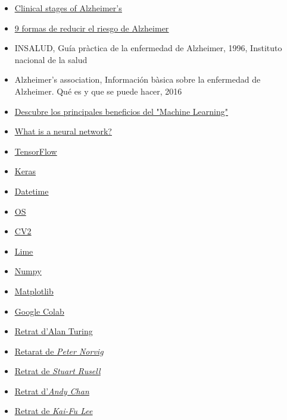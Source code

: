 \documentclass[a4paper,12pt]{article}
\begin{document}
\begin{itemize}
    \item \href{https://www.alzinfo.org/understand-alzheimers/clinical-stages-of-alzheimers/}{\underline{Clinical stages of Alzheimer's}}
    \item \href{https://www.ceafa.es/es/que-comunicamos/noticias/9-formas-de-reducir-el-riesgo-de-alzheimer}{\underline{9 formas de reducir el riesgo de Alzheimer}}
    \item INSALUD, Guía pràctica de la enfermedad de Alzheimer, 1996, Instituto nacional de la salud
    \item Alzheimer’s association, Información bàsica sobre la enfermedad de Alzheimer. Qué es y que se puede hacer, 2016
    \item \href{https://www.iberdrola.com/innovacion/machine-learning-aprendizaje-automatico}{\underline{Descubre los principales beneficios del "Machine Learning"}}
    \item \href{https://aws.amazon.com/es/what-is/neural-network/}{\underline{What is a neural network?}}
    \item \href{https://www.tensorflow.org/?hl=es-419}{\underline{TensorFlow}}
    \item \href{https://keras.io/}{\underline{Keras}}
    \item \href{https://www.w3schools.com/python/python_datetime.asp}{\underline{Datetime}}
    \item \href{https://docs.python.org/3/library/os.html}{\underline{OS}}
    \item \href{https://pypi.org/project/opencv-python/}{\underline{CV2}}
    \item \href{https://towardsdatascience.com/lime-how-to-interpret-machine-learning-models-with-python-94b0e7e4432e}{\underline{Lime}}
    \item \href{https://numpy.org/}{\underline{Numpy}}
    \item \href{https://matplotlib.org/}{\underline{Matplotlib}}
    \item \href{https://colab.research.google.com/}{\underline{Google Colab}}
    \item \href{https://upload.wikimedia.org/wikipedia/commons/a/a1/Alan_Turing_Aged_16.jpg}{\underline{Retrat d'Alan Turing}}
    \item \href{https://cs.berkeley.edu/sites/default/files/news_image/peter_norvig_speaking_at_university_of_california_berkeley_2013.jpg}{\underline{Retarat de \textit{Peter Norvig}}}
    \item \href{https://cs.berkeley.edu/sites/default/files/eecs_tout/russell-aqua.jpg}{\underline{Retrat de \textit{Stuart Rusell}}}
    \item \href{https://media.licdn.com/dms/image/C5603AQHgogiTxs2TZg/profile-displayphoto-shrink_800_800/0/1565701087600?e=2147483647&v=beta&t=p5ZjgearbT6mUGtGi2AEwDY07gaEWxmlGYDypO0HUVU}{\underline{Retrat d'\textit{Andy Chan}}}
    \item \href{https://upload.wikimedia.org/wikipedia/commons/0/0d/Capture_medium.jpg}{\underline{Retrat de \textit{Kai-Fu Lee}}}
\end{itemize}
\end{document}
